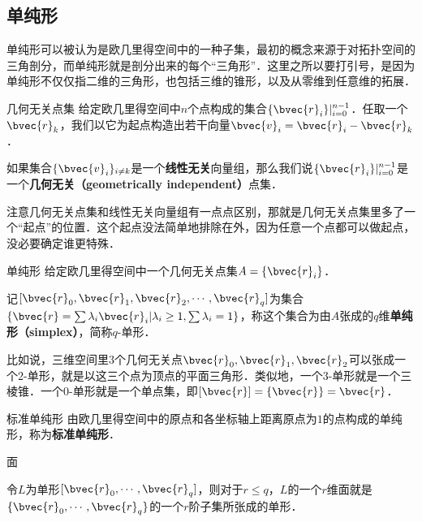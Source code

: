 

\subsection{单纯形}

单纯形可以被认为是欧几里得空间中的一种子集，最初的概念来源于对拓扑空间的三角剖分，而单纯形就是剖分出来的每个“三角形”．这里之所以要打引号，是因为单纯形不仅仅指二维的三角形，也包括三维的锥形，以及从零维到任意维的拓展．

\begin{definition}{几何无关点集}
给定欧几里得空间中$n$个点构成的集合$\{\bvec{r}_i\}|_{i=0}^{n-1}$．任取一个$\bvec{r}_k$，我们以它为起点构造出若干向量$\bvec{v}_i=\bvec{r}_i-\bvec{r}_k$．

如果集合$\{\bvec{v}_i\}_{i\not= k}$是一个\textbf{线性无关}向量组，那么我们说$\{\bvec{r}_i\}|_{i=0}^{n-1}$是一个\textbf{几何无关（geometrically independent）}点集．
\end{definition}

注意几何无关点集和线性无关向量组有一点点区别，那就是几何无关点集里多了一个“起点”的位置．这个起点没法简单地排除在外，因为任意一个点都可以做起点，没必要确定谁更特殊．

\begin{definition}{单纯形}
给定欧几里得空间中一个几何无关点集$A=\{\bvec{r}_i\}$．

记$[\bvec{r}_0, \bvec{r}_1, \bvec{r}_2, \cdots, \bvec{r}_q]$为集合$\{\bvec{r}=\sum\lambda_i\bvec{r}_i|\lambda_i\geq 1, \sum\lambda_i=1\}$，称这个集合为由$A$张成的$q$维\textbf{单纯形（simplex）}，简称$q$-单形．

\end{definition}

比如说，三维空间里$3$个几何无关点$\bvec{r}_0, \bvec{r}_1, \bvec{r}_2$可以张成一个$2$-单形，就是以这三个点为顶点的平面三角形．类似地，一个$3$-单形就是一个三棱锥．一个$0$-单形就是一个单点集，即$[\bvec{r}]=\{\bvec{r}\}=\bvec{r}$．


\begin{definition}{标准单纯形}
由欧几里得空间中的原点和各坐标轴上距离原点为$1$的点构成的单纯形，称为\textbf{标准单纯形}．
\end{definition}



\begin{definition}{面}

令$L$为单形$[\bvec{r}_0, \cdots, \bvec{r}_q]$，则对于$r\leq q$，$L$的一个$r$维面就是$\{\bvec{r}_0, \cdots, \bvec{r}_q\}$的一个$r$阶子集所张成的单形．

\end{definition}


